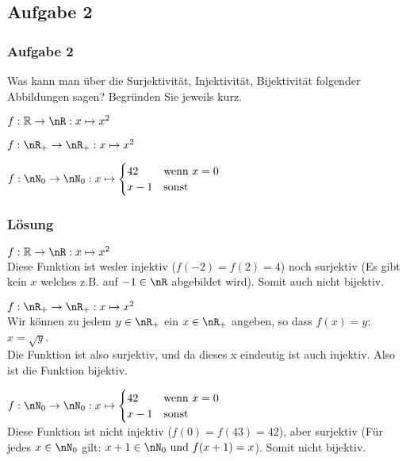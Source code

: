 \subsection{Aufgabe 2}
\begin{frame}
	\frametitle{Aufgabe 2}
	
	Was kann man über die Surjektivität, Injektivität, Bijektivität folgender Abbildungen sagen? Begründen Sie jeweils kurz.
	
	\begin{alist}
		\item $f: \R\to \nR: x \mapsto x^2$
		\item $f: \nR_+ \to \nR_+: x \mapsto x^2$
		\item $f: \nN_0 \to \nN_0 : x \mapsto \begin{cases} 42 &\text{wenn $x = 0$} \\ x - 1 &\text{sonst} \end{cases}$
	\end{alist}
\end{frame}

\begin{frame}
	\frametitle{Lösung}
	\begin{alist}
		\item $f: \R\to \nR: x \mapsto x^2$ \\
		\pause
		Diese Funktion ist weder injektiv ($f(-2) = f(2) = 4$) noch surjektiv (Es gibt kein $x$ welches z.B. auf $-1 \in \nR$ abgebildet wird). Somit auch nicht bijektiv.
		
		\item $f: \nR_+ \to \nR_+: x \mapsto x^2$ \\
		\pause
		Wir können zu jedem $y \in \nR_+$ ein $x \in \nR_+$ angeben, so dass $f(x) = y$: $ x = \sqrt{y}$. \\
		Die Funktion ist also surjektiv, und da dieses x eindeutig ist auch injektiv. Also ist die Funktion bijektiv.
		
		\item $f: \nN_0 \to \nN_0 : x \mapsto \begin{cases} 42 &\text{wenn $x = 0$} \\ x - 1 &\text{sonst} \end{cases}$ \\
		\pause
		Diese Funktion ist nicht injektiv ($f(0) = f(43) = 42$), aber surjektiv (Für jedes $x \in \nN_0$ gilt: $x + 1 \in \nN_0 \text{ und } f(x+1) = x$). Somit nicht bijektiv.
	\end{alist}
\end{frame}

